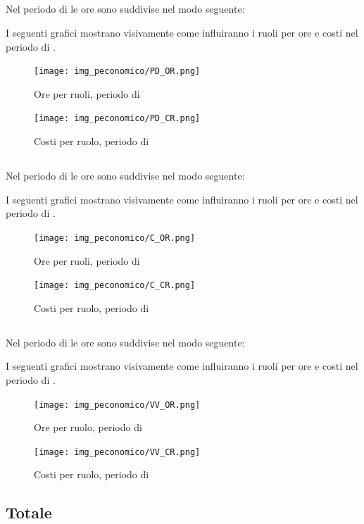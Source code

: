 \subsection{\PD}
Nel periodo di \PD{} le ore sono suddivise nel modo seguente:

I seguenti grafici mostrano visivamente come influiranno i ruoli per ore e costi nel periodo di \PD{}.
\begin{figure}[H]
	\centering
	\texttt{[image: img\_peconomico/PD\_OR.png]}
	\caption{Ore per ruoli, periodo di \PD}
\end{figure}
\begin{figure}[H]
	\centering
	\texttt{[image: img\_peconomico/PD\_CR.png]}
	\caption{Costi per ruolo, periodo di \PD}
\end{figure}

\subsection{\Cod}
Nel periodo di \Cod{} le ore sono suddivise nel modo seguente:

I seguenti grafici mostrano visivamente come influiranno i ruoli per ore e costi nel periodo di \Cod.
\begin{figure}[H]
	\centering
	\texttt{[image: img\_peconomico/C\_OR.png]}
	\caption{Ore per ruoli, periodo di \Cod}
\end{figure}
\begin{figure}[H]
	\centering
	\texttt{[image: img\_peconomico/C\_CR.png]}
	\caption{Costi per ruolo, periodo di \Cod}
\end{figure}

\subsection{\VV}
Nel periodo di \VV{} le ore sono suddivise nel modo seguente:

I seguenti grafici mostrano visivamente come influiranno i ruoli per ore e costi nel periodo di \VV{}.
\begin{figure}[H]
	\centering
	\texttt{[image: img\_peconomico/VV\_OR.png]}
	\caption{Ore per ruolo, periodo di \VV}
\end{figure}
\begin{figure}[H]
	\centering
	\texttt{[image: img\_peconomico/VV\_CR.png]}
	\caption{Costi per ruolo, periodo di \VV}
\end{figure}

\subsection{Totale}
